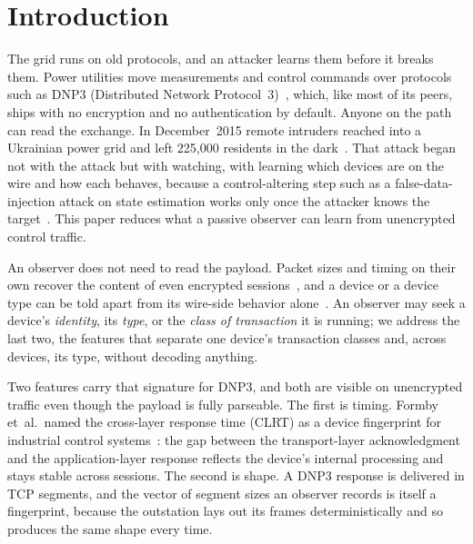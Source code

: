 \section{Introduction}
\label{sec:intro}

The grid runs on old protocols, and an attacker learns them before it breaks them. Power utilities
move measurements and control commands over protocols such as DNP3 (Distributed Network
Protocol~3)~\cite{dnp3std}, which, like most of its peers, ships with no encryption and no
authentication by default. Anyone on the path can read the exchange. In December~2015 remote intruders
reached into a Ukrainian power grid and left 225{,}000 residents in the
dark~\cite{ukraine2015}. That attack began not with the attack but with watching, with learning which
devices are on the wire and how each behaves, because a control-altering step such as a
false-data-injection attack on state estimation works only once the attacker knows the
target~\cite{liufdia2009,cardenas2011}. This paper reduces what a passive observer can learn from
unencrypted control traffic.

An observer does not need to read the payload. Packet sizes and timing on their own recover the
content of even encrypted sessions~\cite{sirinam2018,feghhi2016}, and a device or a device type can be
told apart from its wire-side behavior alone~\cite{kohno2005,gtid2015}. An observer may seek a device's
\emph{identity}, its \emph{type}, or the \emph{class of transaction} it is running; we address the last
two, the features that separate one device's transaction classes and, across devices, its type,
without decoding anything.

Two features carry that signature for DNP3, and both are visible on unencrypted traffic even though
the payload is fully parseable. The first is timing. Formby et~al.\ named the cross-layer response
time (CLRT) as a device fingerprint for industrial control systems~\cite{formby2016}: the gap between
the transport-layer acknowledgment and the application-layer response reflects the device's internal
processing and stays stable across sessions. The second is shape. A DNP3 response is delivered in TCP
segments, and the vector of segment sizes an observer records is itself a fingerprint, because the
outstation lays out its frames deterministically and so produces the same shape every time.

